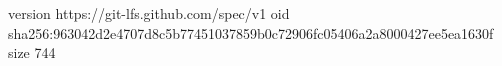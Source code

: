 version https://git-lfs.github.com/spec/v1
oid sha256:963042d2e4707d8c5b77451037859b0c72906fc05406a2a8000427ee5ea1630f
size 744
